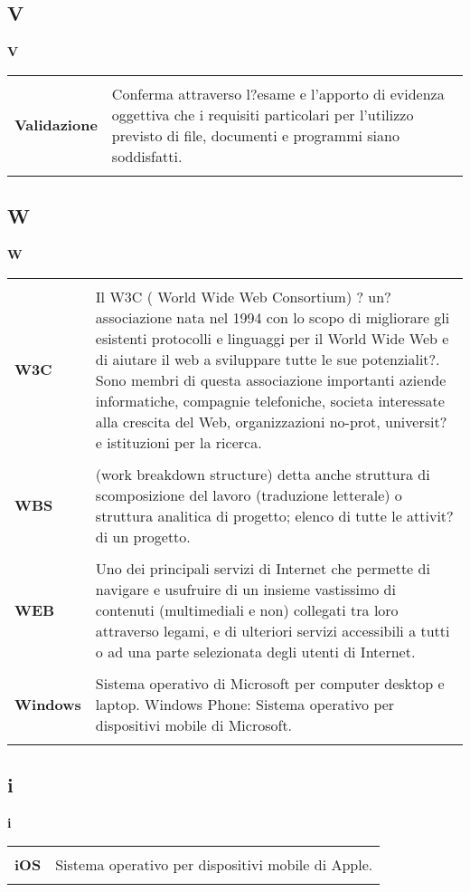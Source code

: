 {\subsection{V} 
\hfill\Huge{\textbf{V}} \\ 
\normalsize 
\begin{longtabu} to 
\toprule \\ 
\textbf{Validazione} & Conferma attraverso l?esame e l'apporto di evidenza oggettiva che i requisiti particolari per l'utilizzo previsto di file, documenti e programmi siano soddisfatti. \\ 
 \\ 
\end{longtabu} 
\newpage 
\subsection{W} 
\hfill\Huge{\textbf{W}} \\ 
\normalsize 
\begin{longtabu} to 
\toprule \\ 
\textbf{W3C} & Il W3C ( World Wide Web Consortium) ? un?associazione nata nel 1994 con lo scopo di migliorare gli esistenti protocolli e linguaggi per il World Wide Web e di aiutare il web a sviluppare tutte le sue potenzialit?. Sono membri di questa associazione importanti aziende informatiche, compagnie telefoniche, societa interessate alla crescita del Web, organizzazioni no-prot, universit? e istituzioni per la ricerca. \\ 
 \\ 
\textbf{WBS} & (work breakdown structure) detta anche struttura di scomposizione del lavoro (traduzione letterale) o struttura analitica di progetto; elenco di tutte le attivit? di un progetto. \\ 
 \\ 
\textbf{WEB} & Uno dei principali servizi di Internet che permette di navigare e usufruire di un insieme vastissimo di contenuti (multimediali e non) collegati tra loro attraverso legami, e di ulteriori servizi accessibili a tutti o ad una parte selezionata degli utenti di Internet. \\ 
 \\ 
\textbf{Windows} & Sistema operativo di Microsoft per computer desktop e laptop. Windows Phone: Sistema operativo per dispositivi mobile di Microsoft. \\ 
 \\ 
\end{longtabu} 
\newpage 
\subsection{i} 
\hfill\Huge{\textbf{i}} \\ 
\normalsize 
\begin{longtabu} to 
\toprule \\ 
\textbf{iOS} & Sistema operativo per dispositivi mobile di Apple. \\ 
 \\ 
\end{longtabu} 
 }